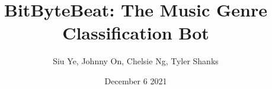\documentclass[10pt,twocolumn,letterpaper]{article}
\title{BitByteBeat: The Music Genre Classification Bot}
\author{Siu Ye, Johnny On, Chelsie Ng, Tyler Shanks}
\date{December 6 2021}
\begin{document}



\fancyfoot{\thepage}





% 




\end{document}
